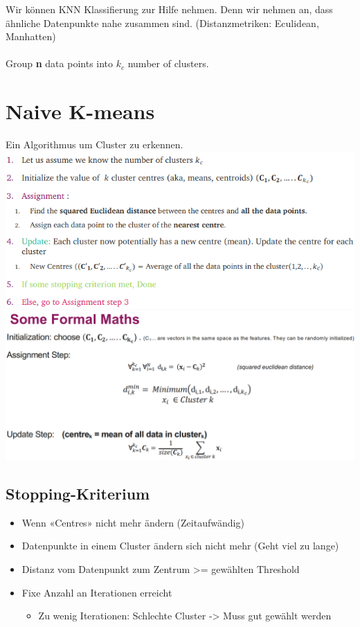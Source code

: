 Wir können KNN Klassifierung zur Hilfe nehmen. Denn wir nehmen an, dass ähnliche Datenpunkte nahe zusammen sind. (Distanzmetriken: Eculidean, Manhatten)\\
\\
Group \textbf{n} data points into $k_c$ number of clusters.
\section{Naive K-means}
Ein Algorithmus um Cluster zu erkennen.
\includegraphics[width=\linewidth]{img/clustering_naive_k-means.png}
\includegraphics[width=\linewidth]{img/k-means_math.png}
\subsection{Stopping-Kriterium}
\begin{itemize}
\item Wenn «Centres» nicht mehr ändern (Zeitaufwändig)
\item Datenpunkte in einem Cluster ändern sich nicht mehr (Geht viel zu lange)
\item Distanz vom Datenpunkt zum Zentrum >= gewählten Threshold
\item Fixe Anzahl an Iterationen erreicht
\begin{itemize}
\item Zu wenig Iterationen: Schlechte Cluster -> Muss gut gewählt werden
\end{itemize}
\end{itemize}
